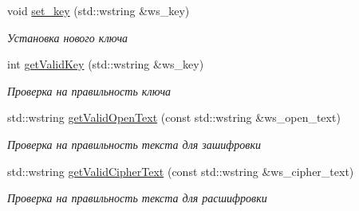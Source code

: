 \begin{DoxyCompactItemize}
void \hyperlink{classCipher_a86145f7c206e6d75852a28ffe29dc47a}{set\+\_\+key} (std\+::wstring \&ws\+\_\+key)
\begin{DoxyCompactList}\small\item\em Установка нового ключа \end{DoxyCompactList}\item 
int \hyperlink{classCipher_aec5962319726c6dd1bd6ee2f7b71e001}{get\+Valid\+Key} (std\+::wstring \&ws\+\_\+key)
\begin{DoxyCompactList}\small\item\em Проверка на правильность ключа \end{DoxyCompactList}\item 
std\+::wstring \hyperlink{classCipher_a0dc9d7c13d6a7401bfee1f1171f6ee12}{get\+Valid\+Open\+Text} (const std\+::wstring \&ws\+\_\+open\+\_\+text)
\begin{DoxyCompactList}\small\item\em Проверка на правильность текста для зашифровки \end{DoxyCompactList}\item 
std\+::wstring \hyperlink{classCipher_ab0e1d86022b18c1bec07cde229ba87e6}{get\+Valid\+Cipher\+Text} (const std\+::wstring \&ws\+\_\+cipher\+\_\+text)
\begin{DoxyCompactList}\small\item\em Проверка на правильность текста для расшифровки \end{DoxyCompactList}\end{DoxyCompactItemize}
